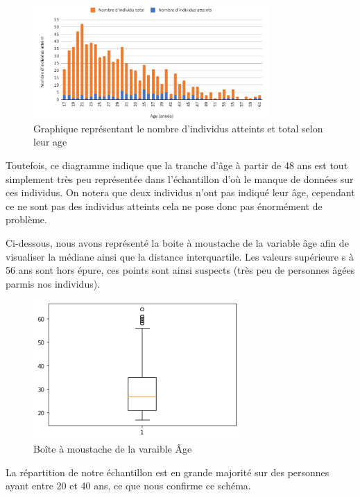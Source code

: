 \documentclass[12,french]{report}
\begin{document}
\begin{figure}[!ht]
	\center
	\includegraphics[width=0.8\textwidth]{./Images/5'}
	\caption{Graphique représentant le nombre d'individus atteints et total selon leur age}
\end{figure}\vspace{0.4cm}

	Toutefois, ce diagramme indique que la tranche d’âge à partir de 48 ans est tout simplement très peu représentée dans l’échantillon d’où le manque de données sur ces individus. On notera que deux individus n’ont pas indiqué leur âge, cependant ce ne sont pas des individus atteints cela ne pose donc pas énormément de problème.

Ci-dessous, nous avons représenté la boite à moustache de la variable âge afin de visualiser la médiane ainsi que la distance interquartile. Les valeurs supérieure	s à 56 ans sont hors épure, ces points sont ainsi suspects (très peu de personnes âgées parmis nos individus).\\

\begin{figure}[!ht]
	\center
	\includegraphics[width=0.7\textwidth]{./Images/6}
	\caption{Boîte à moustache de la varaible Âge}
\end{figure}\vspace{0.1cm}

	La répartition de notre échantillon est en grande majorité sur des personnes ayant entre 20 et 40 ans, ce que nous confirme ce schéma.
\end{document}
